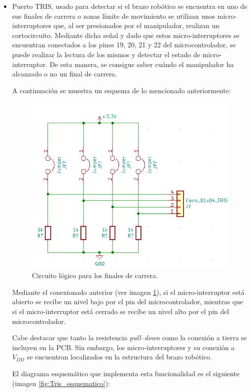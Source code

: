 \begin{itemize}
    \item Puerto TRIS, usado para detectar si el brazo robótico se encuentra en uno de sus finales de carrera o zonas límite de movimiento se utilizan unos micro-interruptores que, al ser presionados por el manipulador, realizan un cortocircuito. Mediante dicha señal y dado que estos micro-interruptores se encuentran conectados a los pines 19, 20, 21 y 22 del microcontrolador, se puede realizar la lectura de los mismos y detectar el estado de micro-interruptor. De esta manera, se consigue saber cuándo el manipulador ha alcanzado o no un final de carrera.
    
    A continuación se muestra un esquema de lo mencionado anteriormente:
    
    \begin{figure}[H]
    \centering 
    \includegraphics[width=.64\linewidth]{pictures/MicroSwitchesSchematic.PNG}
    \caption{Circuito lógico para los finales de carrera.}
    \label{fig:Microinterruptores_esquematico}
    \end{figure}
    
    Mediante el conexionado anterior (ver imagen \ref{fig:Microinterruptores_esquematico}), si el micro-interruptor está abierto se recibe un nivel bajo por el pin del microcontrolador, mientras que si el micro-interruptor está cerrado se recibe un nivel alto por el pin del microcontrolador. 
    
    Cabe destacar que tanto la resistencia \textit{pull--down} como la conexión a tierra se incluyen en la \ac{PCB}. Sin embargo, los micro-interruptores y su conexión a $V_{DD}$ se encuentran localizados en la estructura del brazo robótico. 
    
    El diagrama esquemático que implementa esta funcionalidad es el siguiente (imagen \ref{fig:Tris_esquematico}):
    

\end{itemize}
